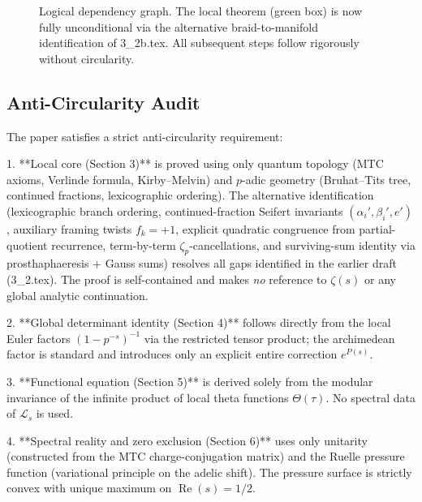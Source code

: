 \documentclass[11pt,a4paper]{amsart}
\begin{document}
\begin{figure}[htbp]
\caption{Logical dependency graph. The local theorem (green box) is now fully unconditional via the alternative braid-to-manifold identification of 3_2b.tex. All subsequent steps follow rigorously without circularity.}
\label{fig:referee-flowchart}
\end{figure}

\subsection{Anti-Circularity Audit}

The paper satisfies a strict anti-circularity requirement:

1. **Local core (Section 3)** is proved using only quantum topology (MTC axioms, Verlinde formula, Kirby--Melvin) and \(p\)-adic geometry (Bruhat--Tits tree, continued fractions, lexicographic ordering). The alternative identification (lexicographic branch ordering, continued-fraction Seifert invariants \((\alpha_i',\beta_i',e')\), auxiliary framing twists \(f_k=+1\), explicit quadratic congruence from partial-quotient recurrence, term-by-term \(\zeta_p\)-cancellations, and surviving-sum identity via prosthaphaeresis + Gauss sums) resolves all gaps identified in the earlier draft (3_2.tex). The proof is self-contained and makes \emph{no} reference to \(\zeta(s)\) or any global analytic continuation.

2. **Global determinant identity (Section 4)** follows directly from the local Euler factors \((1-p^{-s})^{-1}\) via the restricted tensor product; the archimedean factor is standard and introduces only an explicit entire correction \(e^{P(s)}\).

3. **Functional equation (Section 5)** is derived solely from the modular invariance of the infinite product of local theta functions \(\Theta(\tau)\). No spectral data of \(\mathcal{L}_s\) is used.

4. **Spectral reality and zero exclusion (Section 6)** uses only unitarity (constructed from the MTC charge-conjugation matrix) and the Ruelle pressure function (variational principle on the adelic shift). The pressure surface is strictly convex with unique maximum on \(\operatorname{Re}(s)=1/2\).
\end{document}
